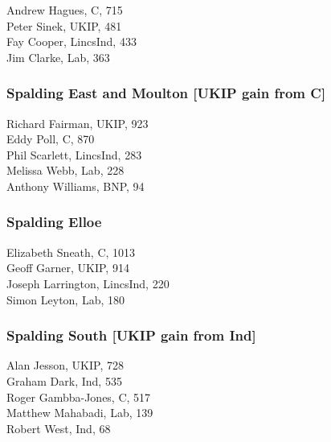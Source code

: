 \documentclass[a4paper,openany,10pt]{book}
\begin{document}


Andrew Hagues, C, 715\\
Peter Sinek, UKIP, 481\\
Fay Cooper, LincsInd, 433\\
Jim Clarke, Lab, 363\\


\subsubsection*{Spalding East and Moulton \hspace*{\fill}\nolinebreak[1]%
\enspace\hspace*{\fill}
[UKIP gain from C]}



Richard Fairman, UKIP, 923\\
Eddy Poll, C, 870\\
Phil Scarlett, LincsInd, 283\\
Melissa Webb, Lab, 228\\
Anthony Williams, BNP, 94\\


\subsubsection*{Spalding Elloe}



Elizabeth Sneath, C, 1013\\
Geoff Garner, UKIP, 914\\
Joseph Larrington, LincsInd, 220\\
Simon Leyton, Lab, 180\\


\subsubsection*{Spalding South \hspace*{\fill}\nolinebreak[1]%
\enspace\hspace*{\fill}
[UKIP gain from Ind]}



Alan Jesson, UKIP, 728\\
Graham Dark, Ind, 535\\
Roger Gambba-Jones, C, 517\\
Matthew Mahabadi, Lab, 139\\
Robert West, Ind, 68\\
\end{document}
